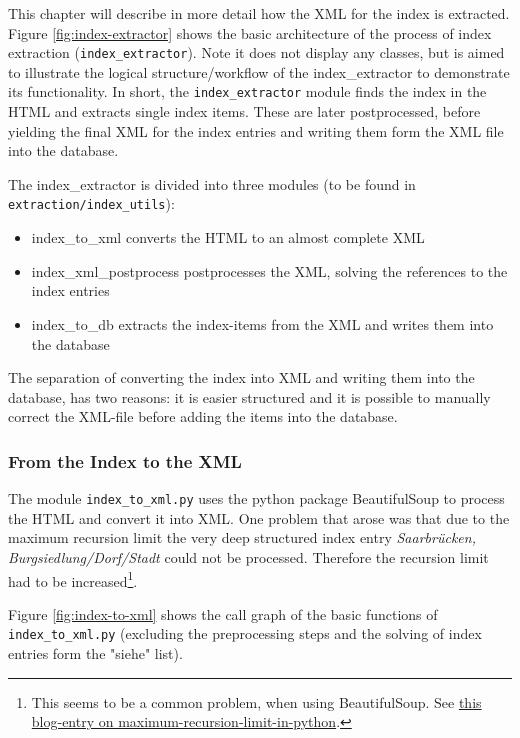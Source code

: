 This chapter will describe in more detail how the XML for the index is extracted. 
Figure \ref{fig:index-extractor} shows the basic architecture of the process of index extraction (\texttt{index\_extractor}). Note it does not display any classes, but is aimed to illustrate the logical structure/workflow of the index\_extractor to demonstrate its functionality. In short, the \texttt{index\_extractor} module finds the index in the HTML and extracts single index items. These are later postprocessed, before yielding the final XML for the index entries and writing them form the XML file into the database.

The index\_extractor is divided into three modules (to be found in \texttt{extraction/index\_utils}):

\begin{itemize}
\item index\_to\_xml converts the HTML to an almost complete XML
\item index\_xml\_postprocess postprocesses the XML, solving the references to the index entries
\item index\_to\_db extracts the index-items from the XML and writes them into the database
\end{itemize}

The separation of converting the index into XML and writing them into the database, has two reasons: it is easier structured and it is possible to manually correct the XML-file before adding the items into the database.

\subsubsection{From the Index to the XML}
The module \texttt{index\_to\_xml.py} uses the python package BeautifulSoup to process the HTML and convert it into XML. One problem that arose was that due to the maximum recursion limit the very deep structured index entry \textit{Saarbrücken, Burgsiedlung/Dorf/Stadt} could not be processed. Therefore the recursion limit had to be increased\footnote{This seems to be a common problem, when using BeautifulSoup. See \href{http://blog.pablohoffman.com/maximum-recursion-limit-in-python}{this blog-entry on maximum-recursion-limit-in-python}.}.

Figure \ref{fig:index-to-xml} shows the call graph of the basic functions of \texttt{index\_to\_xml.py} (excluding the preprocessing steps and the solving of index entries form the "siehe" list).

